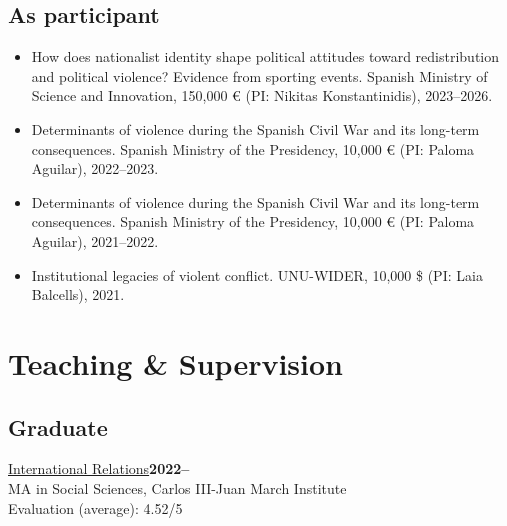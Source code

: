 \documentclass[a4paper, 12pt]{article}
\begin{document}
\subsection*{As participant}

\begin{itemize}[leftmargin=12pt, itemsep=0pt]
	\item How does nationalist identity shape political attitudes toward redistribution and political violence? Evidence from sporting events. Spanish Ministry of Science and Innovation, 150,000 € (PI: Nikitas Konstantinidis), 2023--2026. %
	\item Determinants of violence during the Spanish Civil War and its long-term consequences. Spanish Ministry of the Presidency, 10,000 € (PI: Paloma Aguilar), 2022--2023. %
	\item Determinants of violence during the Spanish Civil War and its long-term consequences. Spanish Ministry of the Presidency, 10,000 € (PI: Paloma Aguilar), 2021--2022. %
	\item Institutional legacies of violent conflict. UNU-WIDER, 10,000 \$ (PI: Laia Balcells), 2021.
\end{itemize}

\section*{Teaching \& Supervision}


\subsection*{Graduate}

\noindent
\href{https://raw.githack.com/franvillamil/syllabi/master/current/syllabus_IR.pdf}{International Relations}\hfill\textbf{2022--}\\
{\small MA in Social Sciences, Carlos III-Juan March Institute}\\
{\small Evaluation (average): 4.52/5} %
\vspace{10pt}
\end{document}

